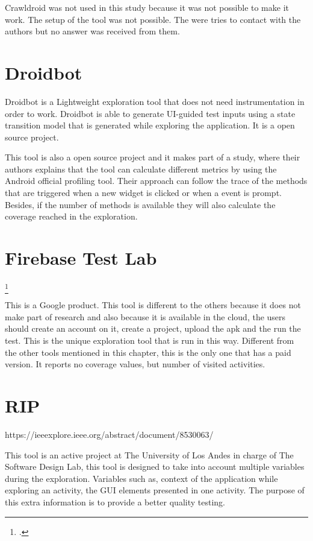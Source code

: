 Crawldroid was not used in this study because it was not possible to make it work. The setup of the tool was not possible. The were tries to contact with the authors but no answer was received from them.

\section{Droidbot}\label{sec:droidbot}
Droidbot is a Lightweight exploration tool that does not need instrumentation in order to work. Droidbot is able to generate UI-guided test inputs using a state transition model that is generated while exploring the application. It is a open source project.

This tool is also a open source project and it makes part of a study, where their authors explains that the tool can calculate different metrics by using the Android official profiling tool. Their approach can follow the trace of the methods that are triggered when a new widget is clicked or when a event is prompt. Besides, if the number of methods is available they will also calculate the coverage reached in the exploration.

\section{Firebase Test Lab}\label{sec:testlab} \footcite{https://firebase.google.com/}

This is a Google product. This tool is different to the others because it does not make part of research and also because it is available in the cloud, the users should create an account on it, create a project, upload the apk and the run the test. This is the unique exploration tool that is run in this way. Different from the other tools mentioned in this chapter, this is the only one that has a paid version. It reports no coverage values, but number of visited activities.

\section{RIP}\label{sec:rip}
https://ieeexplore.ieee.org/abstract/document/8530063/

This tool is an active project at The University of Los Andes in charge of The Software Design Lab, this tool is designed to take into account multiple variables during the exploration. Variables such as, context of the application while exploring an activity, the GUI elements presented in one activity. The purpose of this extra information is to provide a better quality testing. 


